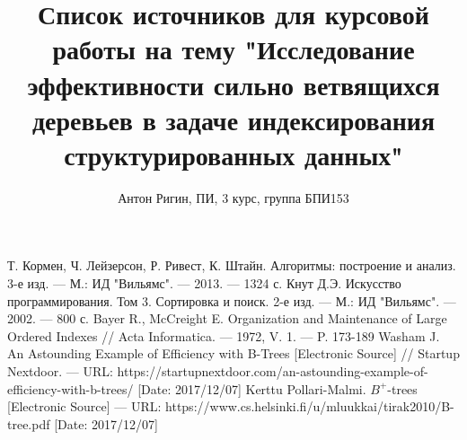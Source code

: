 \documentclass[a4paper,12pt]{article}
\title{Список источников для курсовой работы на тему "Исследование эффективности сильно ветвящихся деревьев в задаче индексирования структурированных данных"}
\author{Антон Ригин, ПИ, 3 курс, группа БПИ153}
\date{}
\begin{document}
	
	\maketitle
	
	\begin{thebibliography}{1}
		Т. Кормен, Ч. Лейзерсон, Р. Ривест, К. Штайн. Алгоритмы: построение и анализ. 3-е изд. --- М.: ИД "Вильямс". --- 2013. --- 1324 с.
		Кнут Д.Э. Искусство программирования. Том 3. Сортировка и поиск. 2-е изд. --- М.: ИД "Вильямс". --- 2002. --- 800 с.
		Bayer R., McCreight E. Organization and Maintenance of Large Ordered Indexes // Acta Informatica. --- 1972, V. 1. --- P. 173-189
		Washam J. An Astounding Example of Efficiency with B-Trees [Electronic Source] // Startup Nextdoor. --- URL: https://startupnextdoor.com/an-astounding-example-of-efficiency-with-b-trees/ [Date: 2017/12/07]
		Kerttu Pollari-Malmi. $B^+$-trees [Electronic Source] --- URL: https://www.cs.helsinki.fi/u/mluukkai/tirak2010/B-tree.pdf [Date: 2017/12/07]
	\end{thebibliography}
	
\end{document}
